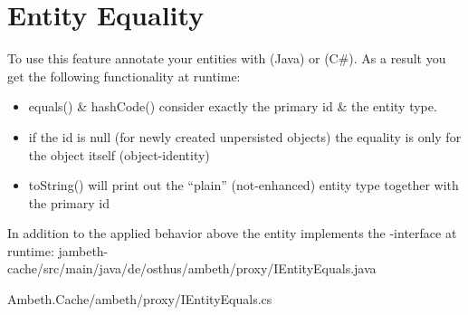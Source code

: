 \section{Entity Equality}
\label{feature:EntityEquals}
\ClearAPI
To use this feature annotate your entities with  (Java) or \type{[EntityEqualsAspect]} (C\#). As a result you get the following functionality at runtime:

\begin{itemize}
	\item equals() \& hashCode() consider exactly the primary id \& the entity type.
	\item if the id is null (for newly created unpersisted objects) the equality is only for the object itself (object-identity)
	\item toString() will print out the ``plain'' (not-enhanced) entity type together with the primary id
\end{itemize}


In addition to the applied behavior above the entity implements the -interface at runtime:
{jambeth-cache/src/main/java/de/osthus/ambeth/proxy/IEntityEquals.java}

{Ambeth.Cache/ambeth/proxy/IEntityEquals.cs}